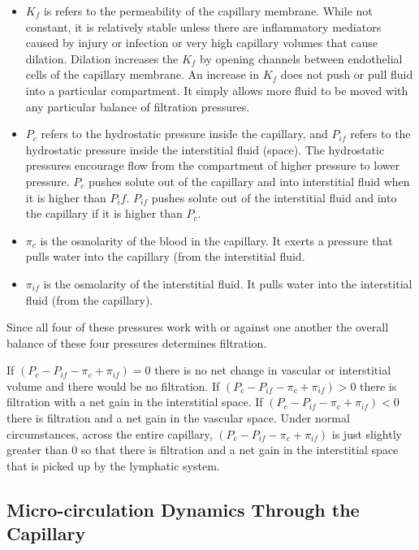 \begin{itemize}
    \item $K_f$ is refers to the permeability of the capillary membrane. While not constant, it is relatively stable unless there are inflammatory mediators caused by injury or infection or very high capillary volumes that cause dilation. Dilation increases the $K_f$ by opening channels between endothelial cells of the capillary membrane. An increase in $K_f$ does not push or pull fluid into a particular compartment. It simply allows more fluid to be moved with any particular balance of filtration pressures.
    \item $P_c$ refers to the hydrostatic pressure inside the capillary, and $P_{if}$ refers to the hydrostatic pressure inside the interstitial fluid (space). The hydrostatic pressures encourage flow from the compartment of higher pressure to lower pressure. $P_c$ pushes solute out of the capillary and into interstitial fluid when it is higher than $P_if$. $P_{if}$ pushes solute out of the interstitial fluid and into the capillary if it is higher than $P_c$.
    \item $\pi_c$ is the osmolarity of the blood in the capillary. It exerts a pressure that pulls water into the capillary (from the interstitial fluid.  
    \item $\pi_{if}$ is the osmolarity of the interstitial fluid. It pulls water into the interstitial fluid (from the capillary). 
\end{itemize}

Since all four of these pressures work with or against one another the overall balance of these four pressures determines filtration. 

If $(P_c - P_{if} - \pi_c + \pi_{if}) = 0$ there is no net change in vascular or interstitial volume and there would be no filtration. If $(P_c - P_{if} - \pi_c + \pi_{if}) > 0$ there is filtration with a net gain in the interstitial space. If $(P_c - P_{if} - \pi_c + \pi_{if}) < 0$ there is filtration and a net gain in the vascular space. Under normal circumstances, across the entire capillary, $(P_c - P_{if} - \pi_c + \pi_{if})$ is just slightly greater than 0 so that there is filtration and a net gain in the interstitial space that is picked up by the lymphatic system. 

\subsection{Micro-circulation Dynamics Through the Capillary}

